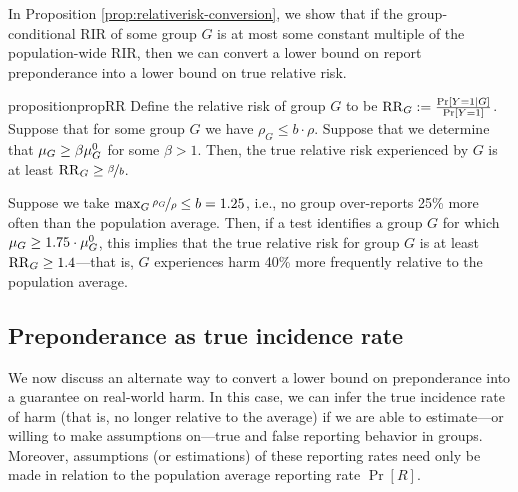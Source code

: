 In Proposition \ref{prop:relativerisk-conversion}, we show that if the group-conditional RIR of some group $G$ is at most some constant multiple of the population-wide RIR, then we can convert a lower bound on report preponderance into a lower bound on true relative risk\iftoggle{icml}{ (see Appendix \ref{app:seq-proofs} for proof)}{}.
\begin{restatable}{proposition}{propRR}
\label{prop:relativerisk-conversion}
Define the relative risk of group $G$ to be $\mathrm{RR}_G := \frac{\Pr[Y = 1 \mid G]}{\Pr[Y = 1]}$. 
Suppose that for some group $G$ we have $\rho_G \leq b \cdot \rho$. Suppose that we determine that $\mu_G \geq \beta{\mu_G^0}$ for some $\beta > 1$. Then, the true relative risk experienced by $G$ is at least $\mathrm{RR}_G \geq \nicefrac{\beta}{b}$.
\end{restatable} 
\iftoggle{icml}{}{
\begin{proof}
First, note that by definition of $\rho$, $\rho_G$, and $\RR_G$, we have 
\[
\rho_G \leq b \cdot \rho \iff \frac{\Pr[R = 1 \mid G ]}{\Pr[Y = 1 \mid G]} \leq b \cdot \frac{\Pr[R = 1]}{\Pr[Y = 1]} \iff \RR_G \geq \frac{\Pr[R = 1 \mid G]}{\Pr[R = 1]} \cdot \frac{1}{b}. 
\]
By Bayes' rule, $\frac{\Pr[R = 1 \mid G]}{\Pr[R = 1]} = \frac{\Pr[ G \mid R = 1]}{\Pr[G]} = \frac{\mu_G}{\Basegroup}$; furthermore, by assumption, we have $\frac{\mu_G}{\Basegroup} \geq \beta$. 
The result follows from combining with the previous display. 
\end{proof}}
Suppose we take $\max_G \nicefrac{\rho_G}{\rho} \leq b = 1.25$, i.e., no group over-reports 25\% more often than the population average. Then, if a test identifies a group $G$ for which $\mu_G \geq 1.75 \cdot {\mu_G^0}$, this implies that the true relative risk for group $G$ is at least $\mathrm{RR}_G \geq 1.4$---that is, $G$ experiences harm 40\% more frequently relative to the population average. 

\subsection{Preponderance as true incidence rate}
\label{subsec:ir}
We now discuss an alternate way to convert a lower bound on preponderance into a guarantee on real-world harm. In this case, we can infer the true incidence rate of harm (that is, no longer relative to the average) if we are able to estimate---or willing to make assumptions on---true and false reporting behavior in groups.
Moreover, assumptions (or estimations) of these reporting rates need only be made in relation to the population average reporting rate $\Pr[R]$. 

